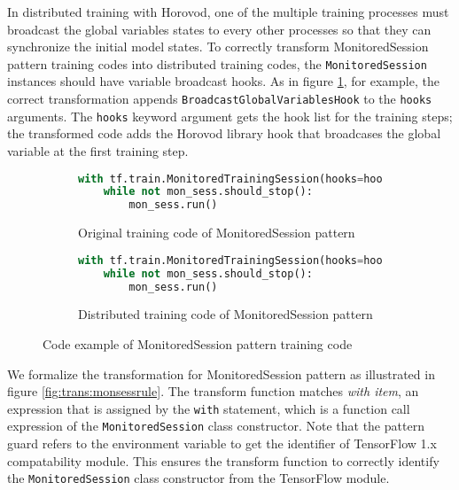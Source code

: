 In distributed training with Horovod, one of the multiple training processes
must broadcast the global variables states to every other processes so that
they can synchronize the initial model states.
To correctly transform MonitoredSession pattern training codes into
distributed training codes, the {\tt MonitoredSession} instances should have
variable broadcast hooks.
As in figure \ref{fig:trans:monsesstrans}, for example,
the correct transformation appends {\tt BroadcastGlobalVariablesHook} to the
{\tt hooks} arguments.
The {\tt hooks} keyword argument gets the hook list for the training steps;
the transformed code adds the Horovod library hook that broadcases the
global variable at the first training step.

\begin{figure}[ht!]
  \centering
  \begin{subfigure}[t]{0.45\textwidth}
    \begin{lstlisting}[language=Python]
with tf.train.MonitoredTrainingSession(hooks=hooks) as mon_sess:
    while not mon_sess.should_stop():
        mon_sess.run()
    \end{lstlisting}
    \caption{Original training code of MonitoredSession pattern}
  \end{subfigure}
  \hspace{5mm}
  \begin{subfigure}[t]{0.45\textwidth}
    \begin{lstlisting}[language=Python]
with tf.train.MonitoredTrainingSession(hooks=hooks.append(hvd.BroadcastGlobalVariablesHook(0)) as mon_sess:
    while not mon_sess.should_stop():
        mon_sess.run()
    \end{lstlisting}
    \caption{Distributed training code of MonitoredSession pattern}
  \end{subfigure}
  \caption{Code example of MonitoredSession pattern training code}
  \label{fig:trans:monsesstrans}
\end{figure}

We formalize the transformation for MonitoredSession pattern as illustrated in
figure \ref{fig:trans:monsessrule}. 
The transform function matches \textit{with item}, an expression that is 
assigned by the {\tt with} statement, which is a function call expression of
the {\tt MonitoredSession} class constructor.
Note that the pattern guard refers to the environment variable to
get the identifier of TensorFlow 1.x compatability module.
This ensures the transform function to correctly identify the
{\tt MonitoredSession} class constructor from the TensorFlow module.   

